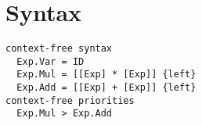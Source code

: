 \chapter{Syntax}

\begin{verbatim}
context-free syntax
  Exp.Var = ID
  Exp.Mul = [[Exp] * [Exp]] {left}
  Exp.Add = [[Exp] + [Exp]] {left}
context-free priorities
  Exp.Mul > Exp.Add
\end{verbatim}

